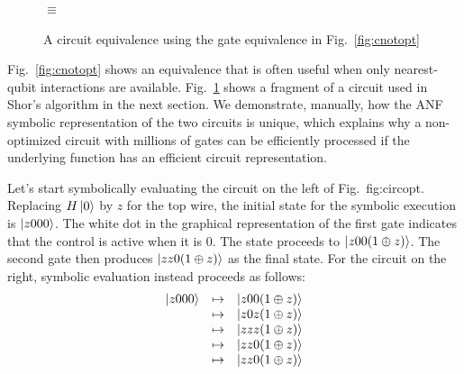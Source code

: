 \documentclass[sigplan,screen]{acmart}
\theoremstyle{definition}
\begin{document}
\begin{figure}[t]
  \centering
\begin{subfigure}[c]{.25\textwidth}
    \centering
\end{subfigure}
\qquad$\equiv$\qquad
\begin{subfigure}[c]{.25\textwidth}
    \centering
 \end{subfigure}
\caption{\label{fig:circopt}A circuit equivalence using the gate
  equivalence in Fig.~\ref{fig:cnotopt}}
\end{figure}

Fig.~\ref{fig:cnotopt} shows an equivalence that is often useful when
only nearest-qubit interactions are available. Fig.~\ref{fig:circopt}
shows a fragment of a circuit used in Shor's algorithm in the next
section. We demonstrate, manually, how the ANF symbolic representation
of the two circuits is unique, which explains why a non-optimized
circuit with millions of gates can be efficiently processed if the
underlying function has an efficient circuit representation.

Let's start symbolically evaluating the circuit on the left of
Fig.~{fig:circopt}. Replacing $H\ket{0}$ by $z$ for the top wire, the
initial state for the symbolic execution is $\ket{z000}$.  The white
dot in the graphical representation of the first gate indicates that
the control is active when it is 0. The state proceeds to
$\ket{z00(1\oplus z)}$. The second gate then produces
$\ket{zz0(1\oplus z)}$ as the final state. For the circuit on the
right, symbolic evaluation instead proceeds as follows:
\[\begin{array}{rcl}
    \ket{z000}  &\mapsto& \ket{z00(1\oplus z)} \\
                &\mapsto& \ket{z0z(1\oplus z)} \\
                &\mapsto& \ket{zzz(1\oplus z)} \\
                &\mapsto& \ket{zz0(1\oplus z)} \\
                &\mapsto& \ket{zz0(1\oplus z)}
\end{array}\]
\end{document}
